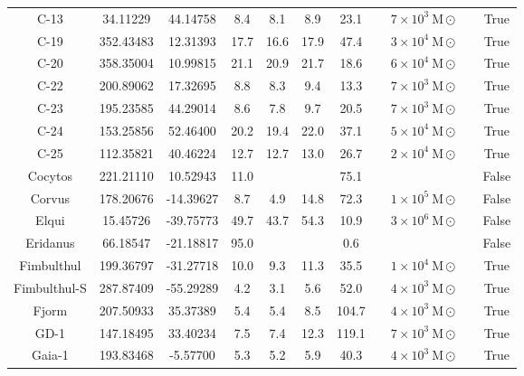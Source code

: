 \begin{table}
\begin{tabular}{ccccccccccc}
C-13 & 34.11229 & 44.14758 & 8.4 & 8.1 & 8.9 & 23.1 & \citet{ibata:2023} & $7 \times 10^{3}~\mathrm{M}\odot$ &  & True \\
C-19 & 352.43483 & 12.31393 & 17.7 & 16.6 & 17.9 & 47.4 & \citet{ibata:2023} & $3 \times 10^{4}~\mathrm{M}\odot$ &  & True \\
C-20 & 358.35004 & 10.99815 & 21.1 & 20.9 & 21.7 & 18.6 & \citet{ibata:2023} & $6 \times 10^{4}~\mathrm{M}\odot$ &  & True \\
C-22 & 200.89062 & 17.32695 & 8.8 & 8.3 & 9.4 & 13.3 & \citet{ibata:2023} & $7 \times 10^{3}~\mathrm{M}\odot$ &  & True \\
C-23 & 195.23585 & 44.29014 & 8.6 & 7.8 & 9.7 & 20.5 & \citet{ibata:2023} & $7 \times 10^{3}~\mathrm{M}\odot$ &  & True \\
C-24 & 153.25856 & 52.46400 & 20.2 & 19.4 & 22.0 & 37.1 & \citet{ibata:2023} & $5 \times 10^{4}~\mathrm{M}\odot$ &  & True \\
C-25 & 112.35821 & 40.46224 & 12.7 & 12.7 & 13.0 & 26.7 & \citet{ibata:2023} & $2 \times 10^{4}~\mathrm{M}\odot$ &  & True \\
Cocytos & 221.21110 & 10.52943 & 11.0 & & & 75.1 & \citet{grillmair:2009} & &  & False \\
Corvus & 178.20676 & -14.39627 & 8.7 & 4.9 & 14.8 & 72.3 & \citet{mateu:2018} & $1 \times 10^{5}~\mathrm{M}\odot$ & \citet{mateu:2018} & False \\
Elqui & 15.45726 & -39.75773 & 49.7 & 43.7 & 54.3 & 10.9 & \citet{shipp:2019} & $3 \times 10^{6}~\mathrm{M}\odot$ & \citet{shipp:2018} & False \\
Eridanus & 66.18547 & -21.18817 & 95.0 & & & 0.6 & \citet{myeong:2017} & &  & False \\
Fimbulthul & 199.36797 & -31.27718 & 10.0 & 9.3 & 11.3 & 35.5 & \citet{ibata:2023} & $1 \times 10^{4}~\mathrm{M}\odot$ &  & True \\
Fimbulthul-S & 287.87409 & -55.29289 & 4.2 & 3.1 & 5.6 & 52.0 & \citet{ibata:2023} & $4 \times 10^{3}~\mathrm{M}\odot$ &  & True \\
Fjorm & 207.50933 & 35.37389 & 5.4 & 5.4 & 8.5 & 104.7 & \citet{ibata:2023} & $4 \times 10^{3}~\mathrm{M}\odot$ &  & True \\
GD-1 & 147.18495 & 33.40234 & 7.5 & 7.4 & 12.3 & 119.1 & \citet{ibata:2023} & $7 \times 10^{3}~\mathrm{M}\odot$ &  & True \\
Gaia-1 & 193.83468 & -5.57700 & 5.3 & 5.2 & 5.9 & 40.3 & \citet{ibata:2023} & $4 \times 10^{3}~\mathrm{M}\odot$ &  & True \\

\end{tabular}
\end{table}
